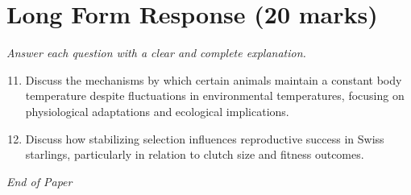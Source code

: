 \documentclass[12pt]{article}
\begin{document}
\section*{Long Form Response (20 marks)}
\textit{Answer each question with a clear and complete explanation.}
\begin{enumerate}[label=\arabic*.]
\setcounter{enumi}{10}
\item Discuss the mechanisms by which certain animals maintain a constant body temperature despite fluctuations in environmental temperatures, focusing on physiological adaptations and ecological implications.
\item Discuss how stabilizing selection influences reproductive success in Swiss starlings, particularly in relation to clutch size and fitness outcomes.
\end{enumerate}

\vfill
\noindent\textit{End of Paper}
\end{document}
